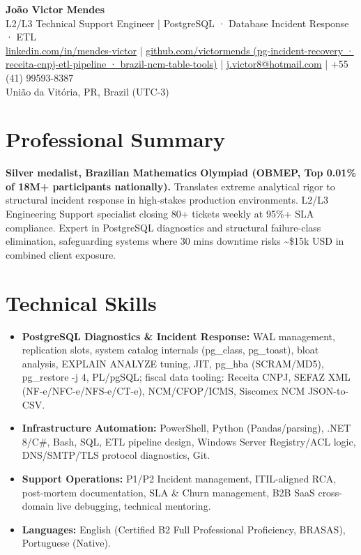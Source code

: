 \documentclass[11pt,letterpaper]{article}
\begin{document}
\begin{center}
    {\huge \textbf{João Victor Mendes}} \\
\vspace{8pt}
    {\large L2/L3 Technical Support Engineer | PostgreSQL · Database Incident Response · ETL} \\
    \vspace{2pt}
    \href{https://linkedin.com/in/mendes-victor}{linkedin.com/in/mendes-victor} | \href{https://github.com/victormends}{github.com/victormends \small(pg-incident-recovery · receita-cnpj-etl-pipeline · brazil-ncm-table-tools)} | \href{mailto:j.victor8@hotmail.com}{j.victor8@hotmail.com} | +55 (41) 99593-8387 \\
    União da Vitória, PR, Brazil (UTC-3)
\end{center}

\section{Professional Summary}
\textbf{Silver medalist, Brazilian Mathematics Olympiad (OBMEP, Top 0.01\% of 18M+ participants nationally).} Translates extreme analytical rigor to structural incident response in high-stakes production environments. L2/L3 Engineering Support specialist closing 80+ tickets weekly at 95\%+ SLA compliance. Expert in PostgreSQL diagnostics and structural failure-class elimination, safeguarding systems where 30 mins downtime risks \textasciitilde\$15k USD in combined client exposure.

\section{Technical Skills}
\begin{itemize}
    \item \textbf{PostgreSQL Diagnostics \& Incident Response:} WAL management, replication slots, system catalog internals (pg\_class, pg\_toast), bloat analysis, EXPLAIN ANALYZE tuning, JIT, pg\_hba (SCRAM/MD5), pg\_restore -j 4, PL/pgSQL; fiscal data tooling: Receita CNPJ, SEFAZ XML (NF-e/NFC-e/NFS-e/CT-e), NCM/CFOP/ICMS, Siscomex NCM JSON-to-CSV.
    \item \textbf{Infrastructure Automation:} PowerShell, Python (Pandas/parsing), .NET 8/C\#, Bash, SQL, ETL pipeline design, Windows Server Registry/ACL logic, DNS/SMTP/TLS protocol diagnostics, Git.
    \item \textbf{Support Operations:} P1/P2 Incident management, ITIL-aligned RCA, post-mortem documentation, SLA \& Churn management, B2B SaaS cross-domain live debugging, technical mentoring.
    \item \textbf{Languages:} English (Certified B2 Full Professional Proficiency, BRASAS), Portuguese (Native).
\end{itemize}
\end{document}
